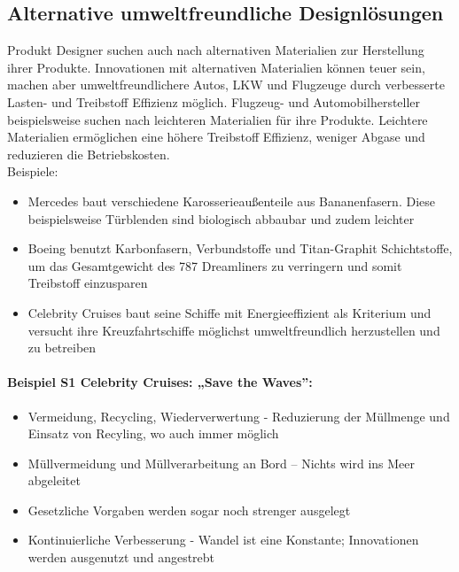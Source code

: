 \documentclass[13pt,titlepage]{article}
\begin{document}
\subsection {Alternative umweltfreundliche Designl\"osungen}
	Produkt Designer suchen auch nach alternativen Materialien zur Herstellung ihrer Produkte. 
Innovationen mit alternativen Materialien können teuer sein, machen aber umweltfreundlichere Autos, LKW und Flugzeuge durch verbesserte Lasten- und Treibstoff Effizienz möglich. 
Flugzeug- und Automobilhersteller beispielsweise suchen nach leichteren Materialien für ihre Produkte. 
Leichtere Materialien ermöglichen eine höhere Treibstoff Effizienz, weniger Abgase und reduzieren die Betriebskosten.\\
	
	Beispiele:
	\begin{itemize}
	  \item Mercedes baut verschiedene Karosserieaußenteile aus Bananenfasern. Diese beispielsweise T\"urblenden sind biologisch abbaubar und zudem leichter
	  \item Boeing benutzt Karbonfasern, Verbundstoffe und Titan-Graphit Schichtstoffe, um das Gesamtgewicht des 787 Dreamliners zu verringern und somit Treibstoff einzusparen
	  \item Celebrity Cruises baut seine Schiffe mit Energieeffizient als Kriterium und versucht ihre Kreuzfahrtschiffe m\"oglichst umweltfreundlich herzustellen und zu betreiben
	\end{itemize}
	
	\paragraph{Beispiel S1 Celebrity Cruises: „Save the Waves”\protect\footnotemark:}
	\begin{itemize}
	  \item Vermeidung, Recycling, Wiederverwertung - Reduzierung der Müllmenge und Einsatz von Recyling, wo auch immer m\"oglich
	  \item Müllvermeidung und Müllverarbeitung an Bord – Nichts wird ins Meer abgeleitet
	  \item Gesetzliche Vorgaben werden sogar noch strenger ausgelegt
	  \item Kontinuierliche Verbesserung - Wandel ist eine Konstante; Innovationen werden ausgenutzt und angestrebt
	\end{itemize}
	
\end{document}
